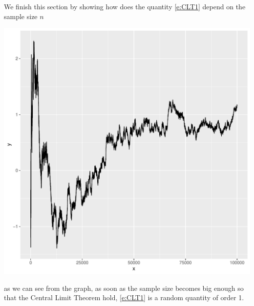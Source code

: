       We finish this section by showing how does the quantity \eqref{e:CLT1} depend on the sample size $n$
\begin{knitrout}
\color{fgcolor}\begin{kframe}
\begin{alltt}
 \hlkwb{<-} 
 \hlkwb{<-} 
 \hlkwb{<-} 
 \hlkwb{<-} 
 \hlkwb{<-} \hldef{((}\hlopt{:}\hlopt{*}\hldef{(} \hlopt{/}\hlopt{:} \hlopt{-} \hlopt{/}
\hldef{(}  \hldef{=} \hldef{(} \hldef{=} \hlopt{:}   \hlopt{+}
        \hldef{(}
\end{alltt}
\end{kframe}
\includegraphics[width=\maxwidth]{images/statistics//unnamed-chunk-43-1} 
\end{knitrout}
as we can see from the graph, as soon as the sample size becomes big enough so that the Central Limit Theorem hold,  \eqref{e:CLT1} is a random quantity of order 1. 


